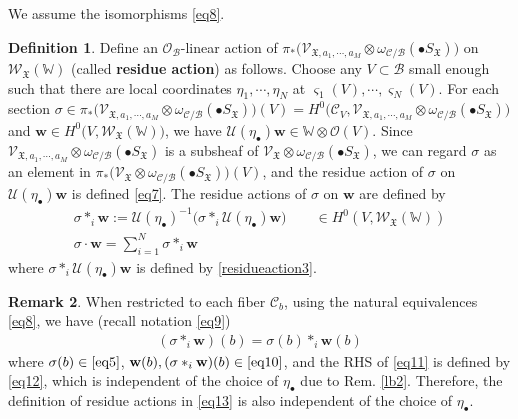 \documentclass[11pt,b5paper,notitlepage]{article}
\theoremstyle{definition}
\newtheorem{df}{Definition}[subsection]
\newtheorem{rem}[df]{Remark}
\theoremstyle{plain}
\newcommand{\mc}{\mathcal}
\newcommand{\SV}{\mathscr{V}}
\newcommand{\blt}{\bullet}
\newcommand{\Wbb}{\mathbb W}
\newcommand{\wbf}{\mathbf w}
\newcommand{\<}{\left\langle}
\renewcommand{\>}{\right\rangle}
\newcommand{\MO}{\mathcal{O}}
\newcommand{\MU}{\mathcal{U}}
\newcommand{\MC}{\mathcal{C}}
\newcommand{\MB}{\mathcal{B}}
\newcommand{\fx}{\mathfrak{X}}
\newcommand{\SW}{\mathscr{W}}
\numberwithin{equation}{subsection}
\begin{document}
We assume the isomorphisms \eqref{eq8}.
\begin{df}
Define an $\mc O_{\mc B}$-linear action of $\pi_*\big(\SV_{\fx,a_1,\cdots,a_M}\otimes \omega_{\MC/\MB}(\blt S_\fx)\big)$ on $\SW_\fx(\Wbb)$ (called \textbf{residue action})  as follows. Choose any $V\subset \MB$ small enough such that there are local coordinates $\eta_1,\cdots,\eta_N$ at $\varsigma_1(V),\cdots,\varsigma_N(V)$. For each section $\sigma\in \pi_*\big(\SV_{\fx,a_1,\cdots,a_M}\otimes \omega_{\MC/\MB}(\blt S_\fx)\big)(V)=H^0\big(\MC_V,\SV_{\fx,a_1,\cdots,a_M}\otimes \omega_{\MC/\MB}(\blt S_\fx)\big)$ and $\wbf\in H^0\big(V,\SW_\fx(\Wbb)\big)$, we have $\MU(\eta_\blt)\wbf\in \Wbb\otimes \MO(V)$. Since $\SV_{\fx,a_1,\cdots,a_M}\otimes \omega_{\MC/\MB}(\blt S_\fx)$ is a subsheaf of $\SV_{\fx}\otimes \omega_{\MC/\MB}(\blt S_\fx)$, we can regard $\sigma$ as an element in $\pi_*\big(\SV_{\fx}\otimes \omega_{\MC/\MB}(\blt S_\fx)\big)(V)$, and the residue action of $\sigma$ on $\MU(\eta_\blt)\wbf$ is defined \eqref{eq7}. The residue actions of $\sigma$ on $\wbf$ are defined by
\begin{subequations}\label{eq13}
\begin{gather}
\sigma *_i \wbf:=\MU(\eta_\blt)^{-1}\big(\sigma *_i \MU(\eta_\blt)\wbf\big)\qquad\in H^0(V,\SW_\fx(\Wbb))  \label{eq50}\\
\sigma \cdot \wbf=\sum_{i=1}^N\sigma*_i \wbf
\end{gather}
\end{subequations}
where $\sigma *_i \MU(\eta_\blt)\wbf$ is defined by \eqref{residueaction3}.
\end{df}




\begin{rem}\label{lb13}
When restricted to each fiber $\mc C_b$, using the natural equivalences \eqref{eq8}, we have (recall notation \eqref{eq9})
\begin{align}
(\sigma *_i\wbf)(b)=\sigma(b) *_i \wbf(b) \label{eq11}
\end{align}
where $\sigma(b)\in\eqref{eq5}$, $\wbf(b),(\sigma *_i\wbf)(b)\in\eqref{eq10}$, and the RHS of \eqref{eq11} is defined by \eqref{eq12}, which is independent of the choice of $\eta_\blt$ due to Rem. \ref{lb2}. Therefore, the definition of residue actions in \eqref{eq13} is also independent of the choice of $\eta_\blt$.
\end{rem}
\end{document}
